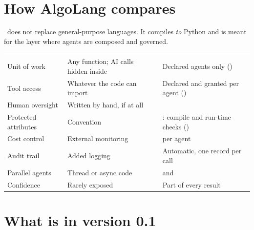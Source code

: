 \section{How AlgoLang compares}

\algolang\ does not replace general-purpose languages. It compiles \emph{to} Python and is meant for the layer where agents are composed and governed.

\begin{center}
\small
\begin{tabularx}{\linewidth}{@{}L{3.6cm}YY@{}}
\toprule
{} &  & \\
\goldrule
Unit of work & Any function; AI calls hidden inside & Declared agents only ()\\
Tool access & Whatever the code can import & Declared and granted per agent ()\\
Human oversight & Written by hand, if at all & \\
Protected attributes & Convention & : compile and run-time checks ()\\
Cost control & External monitoring &  per agent\\
Audit trail & Added logging & Automatic, one record per call\\
Parallel agents & Thread or async code &  and \\
Confidence & Rarely exposed & Part of every result\\
\bottomrule
\end{tabularx}
\end{center}

\section{What is in version 0.1}

